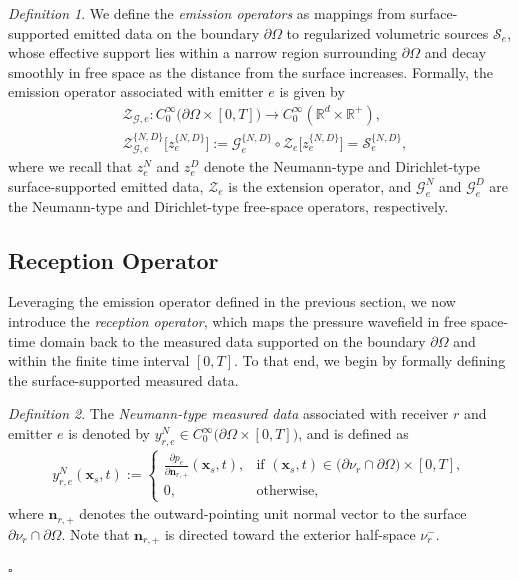 \documentclass[11pt,reqno]{amsart}
\theoremstyle{remark}
\newtheorem{definition}{Definition}
\theoremstyle{italic_lemma}
\newcommand{\bx}{\boldsymbol{x}}
\newcommand{\bn}{\boldsymbol{n}}
\begin{document}
\begin{definition}
We define the \emph{emission operators} as mappings from surface-supported emitted data on the boundary \( \partial \Omega \) to regularized volumetric sources \( \mathcal{S}_e \), whose effective support lies within a narrow region surrounding \( \partial \Omega \) and decay smoothly in free space as the distance from the surface increases. Formally, the emission operator associated with emitter \( e \) is given by
\begin{align}  \label{eq:emission}
    & \mathcal{Z}_{\mathcal{G},e} : C_0^{\infty} \big( \partial \Omega \times [0,T] \big) \rightarrow C_0^{\infty} \left( \mathbb{R}^d \times \mathbb{R}^+ \right), \\
    & \mathcal{Z}_{\mathcal{G},e}^{\{N,D\}} \big[ z_e^{\{N,D\}} \big] := \mathcal{G}_e^{\{N,D\}} \circ \mathcal{Z}_e \big[ z_e^{\{N,D\}} \big] = \mathcal{S}_e^{\{N,D\}},
\end{align}
where we recall that \( z_e^N \) and \( z_e^D \) denote the Neumann-type and Dirichlet-type surface-supported emitted data, \( \mathcal{Z}_e \) is the extension operator, and \( \mathcal{G}_e^N \) and \( \mathcal{G}_e^D \) are the Neumann-type and Dirichlet-type free-space operators, respectively.
\end{definition}




\subsection{Reception Operator}

Leveraging the emission operator defined in the previous section, we now introduce the \emph{reception operator}, which maps the pressure wavefield in free space-time domain back to the measured data supported on the boundary \( \partial \Omega \) and within the finite time interval \( [0, T] \). To that end, we begin by formally defining the surface-supported measured data.

\begin{definition} \label{def:measured-data-Neumann}
The \emph{Neumann-type measured data} associated with receiver \( r \) and emitter \( e \) is denoted by \( y_{r,e} ^N \in C_0^{\infty} \big( \partial \Omega \times [0,T] \big) \), and is defined as
    \begin{align}
        y_{r,e}^N(\bx_s, t) := 
        \begin{cases}
            \displaystyle\frac{\partial p_e}{\partial \bn_{r,+}}(\bx_s, t), & \text{if } (\bx_s, t) \in \big( \partial \nu_r \cap \partial \Omega \big) \times [0,T], \\[0.5em]
            0, & \text{otherwise},
       \end{cases}
    \end{align}
where \( \bn_{r,+} \) denotes the outward-pointing unit normal vector to the surface \( \partial \nu_r \cap \partial \Omega \). Note that \( \bn_{r,+} \) is directed toward the exterior half-space \( \nu_r^- \).
\end{definition}
\hfill\(\square\)
\end{document}
